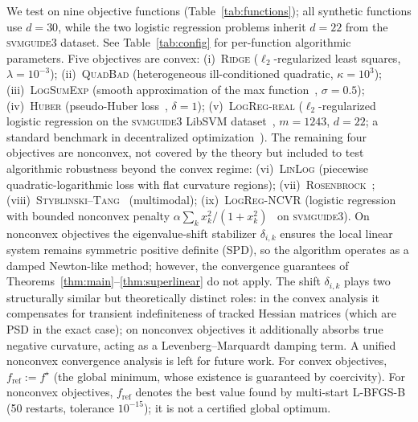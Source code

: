 \documentclass[review,onefignum,onetabnum]{siamart171218}
\begin{document}
	We test on nine objective functions
	(Table~\ref{tab:functions});
	all synthetic functions use $d{=}30$, while the two logistic regression
	problems inherit $d{=}22$ from the \textsc{svmguide3} dataset.
	See Table~\ref{tab:config} for per-function algorithmic parameters.
	Five objectives are convex:
	(i)~\textsc{Ridge} ($\ell_2$-regularized least squares, $\lambda{=}10^{-3}$);
	(ii)~\textsc{QuadBad} (heterogeneous ill-conditioned quadratic, $\kappa{=}10^3$);
	(iii)~\textsc{LogSumExp}
	(smooth approximation of the max function~\citep{nesterov2005smooth},
	$\sigma{=}0.5$);
	(iv)~\textsc{Huber}
	(pseudo-Huber loss~\citep{charbonnier1997huber}, $\delta{=}1$);
	(v)~\textsc{LogReg-real} ($\ell_2$-regularized logistic regression on the
	\textsc{svmguide3} LibSVM dataset~\citep{chang2011libsvm},
	$m{=}1243$, $d{=}22$;
	a standard benchmark in decentralized
	optimization~\citep{shi2015extra,sun2022sonata}).
	The remaining four objectives are nonconvex, not covered by the theory but included
	to test algorithmic robustness beyond the convex regime:
	(vi)~\textsc{LinLog} (piecewise quadratic-logarithmic loss with flat curvature regions);
	(vii)~\textsc{Rosenbrock}~\citep{rosenbrock1960automatic};
	(viii)~\textsc{Styblinski--Tang}~\citep{styblinski1990experiments} (multimodal);
	(ix)~\textsc{LogReg-NCVR} (logistic regression with
	bounded nonconvex penalty $\alpha\sum_k x_k^2/(1{+}x_k^2)$~\citep{geman1995nonlinear}
	on \textsc{svmguide3}).
	On nonconvex objectives the eigenvalue-shift stabilizer $\delta_{i,k}$
	ensures the local linear system remains symmetric positive definite (SPD), so the algorithm operates
	as a damped Newton-like method; however, the convergence
	guarantees of Theorems~\ref{thm:main}--\ref{thm:superlinear} do
	not apply.
	The shift $\delta_{i,k}$ plays two structurally similar but
	theoretically distinct roles:
	in the convex analysis it compensates for transient indefiniteness of
	tracked Hessian matrices (which are PSD in the exact case);
	on nonconvex objectives it additionally absorbs true negative
	curvature, acting as a Levenberg--Marquardt damping term.
	A unified nonconvex convergence analysis is left for future work.
	For convex objectives, $f_{\mathrm{ref}}:=f^\star$ (the global minimum,
	whose existence is guaranteed by coercivity).
	For nonconvex objectives, $f_{\mathrm{ref}}$ denotes the best value
	found by multi-start L-BFGS-B (50 restarts, tolerance $10^{-15}$);
	it is not a certified global optimum.
	
\end{document}
